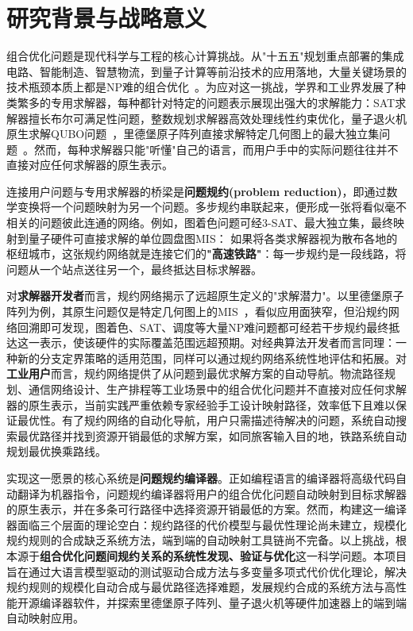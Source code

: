 
\section{研究背景与战略意义}

组合优化问题是现代科学与工程的核心计算挑战。从"十五五"规划重点部署的集成电路、智能制造、智慧物流，到量子计算等前沿技术的应用落地，大量关键场景的技术瓶颈本质上都是NP难的组合优化~\cite{Lucas2014Frontiers}。为应对这一挑战，学界和工业界发展了种类繁多的专用求解器，每种都针对特定的问题表示展现出强大的求解能力：SAT求解器擅长布尔可满足性问题，整数规划求解器高效处理线性约束优化，量子退火机原生求解QUBO问题~\cite{DWave2025Science}，里德堡原子阵列直接求解特定几何图上的最大独立集问题~\cite{Ebadi2022Science}。然而，每种求解器只能"听懂"自己的语言，而用户手中的实际问题往往并不直接对应任何求解器的原生表示。

连接用户问题与专用求解器的桥梁是\textbf{问题规约(problem reduction)}，即通过数学变换将一个问题映射为另一个问题。多步规约串联起来，便形成一张将看似毫不相关的问题彼此连通的网络。例如，图着色问题可经3-SAT、最大独立集，最终映射到量子硬件可直接求解的单位圆盘图MIS：
如果将各类求解器视为散布各地的枢纽城市，这张规约网络就是连接它们的\textbf{"高速铁路"}：每一步规约是一段线路，将问题从一个站点送往另一个，最终抵达目标求解器。

对\textbf{求解器开发者}而言，规约网络揭示了远超原生定义的"求解潜力"。以里德堡原子阵列为例，其原生问题仅是特定几何图上的MIS~\cite{Nguyen2023PRXQuantum}，看似应用面狭窄，但沿规约网络回溯即可发现，图着色、SAT、调度等大量NP难问题都可经若干步规约最终抵达这一表示，使该硬件的实际覆盖范围远超预期。对经典算法开发者而言同理：一种新的分支定界策略的适用范围，同样可以通过规约网络系统性地评估和拓展。对\textbf{工业用户}而言，规约网络提供了从问题到最优求解方案的自动导航。物流路径规划、通信网络设计、生产排程等工业场景中的组合优化问题并不直接对应任何求解器的原生表示，当前实践严重依赖专家经验手工设计映射路径，效率低下且难以保证最优性。有了规约网络的自动化导航，用户只需描述待解决的问题，系统自动搜索最优路径并找到资源开销最低的求解方案，如同旅客输入目的地，铁路系统自动规划最优换乘路线。

实现这一愿景的核心系统是\textbf{问题规约编译器}。正如编程语言的编译器将高级代码自动翻译为机器指令，问题规约编译器将用户的组合优化问题自动映射到目标求解器的原生表示，并在多条可行路径中选择资源开销最低的方案。然而，构建这一编译器面临三个层面的理论空白：规约路径的代价模型与最优性理论尚未建立，规模化规约规则的合成缺乏系统方法，端到端的自动映射工具链尚不完备。以上挑战，根本源于\textbf{组合优化问题间规约关系的系统性发现、验证与优化}这一科学问题。本项目旨在通过大语言模型驱动的测试驱动合成方法与多变量多项式代价优化理论，解决规约规则的规模化自动合成与最优路径选择难题，发展规约合成的系统方法与高性能开源编译器软件，并探索里德堡原子阵列、量子退火机等硬件加速器上的端到端自动映射应用。


